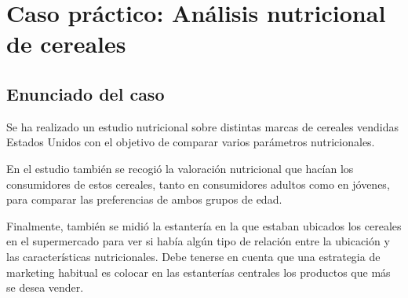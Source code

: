 \documentclass[a4paper,titlepage]{article}
\begin{document}
\sloppy

\bigskip
\section*{\color{blueceu}Caso práctico: Análisis nutricional de cereales}

\subsection*{\color{blueceu}Enunciado del caso}
Se ha realizado un estudio nutricional sobre distintas marcas de cereales vendidas Estados Unidos con el objetivo de comparar varios parámetros nutricionales.

En el estudio también se recogió la valoración nutricional que hacían los consumidores de estos cereales, tanto en consumidores adultos como en jóvenes, para comparar las preferencias de ambos grupos de edad.

Finalmente, también se midió la estantería en la que estaban ubicados los cereales en el supermercado para ver si había algún tipo de relación entre la ubicación y las características nutricionales. Debe tenerse en cuenta que una estrategia de marketing habitual es colocar en las estanterías centrales los productos que más se desea vender.
\end{document}
